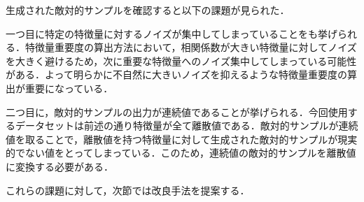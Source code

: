 生成された敵対的サンプルを確認すると以下の課題が見られた．

一つ目に特定の特徴量に対するノイズが集中してしまっていることをも挙げられる．特徴量重要度の算出方法において，相関係数が大きい特徴量に対してノイズを大きく避けるため，次に重要な特徴量へのノイズ集中してしまっている可能性がある．よって明らかに不自然に大きいノイズを抑えるような特徴量重要度の算出が重要になっている．
    

二つ目に，敵対的サンプルの出力が連続値であることが挙げられる．今回使用するデータセットは前述の通り特徴量が全て離散値である．敵対的サンプルが連続値を取ることで，離散値を持つ特徴量に対して生成された敵対的サンプルが現実的でない値をとってしまっている．このため，連続値の敵対的サンプルを離散値に変換する必要がある．


これらの課題に対して，次節では改良手法を提案する．